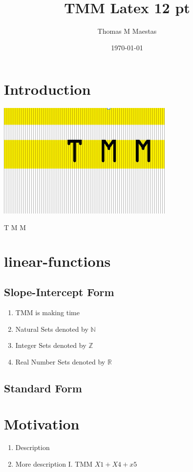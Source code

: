 \documentclass[12pt,letterpaper]{article}
\begin{document}
\date{\today}
\title{TMM Latex 12 pt}
\author{Thomas M Maestas}
\maketitle
\section{Introduction} 
\begin{center}
\includegraphics[scale=0.5]{../assets/TMM.jpg}
\end{center}
\begin{huge}T M M 
\end{huge}
\section{linear-functions}
\subsection{Slope-Intercept Form}
\begin{enumerate}
\item TMM is making time
\item Natural Sets denoted by $\mathbb{N}$
\item Integer Sets denoted by $\mathbb{Z}$
\item Real Number Sets denoted by $\mathbb{R}$
\end{enumerate}
\subsection{Standard Form}
\section{Motivation}
\begin{enumerate}
\item Description
\item More description
I. TMM $X1 + X4 +x5$
\end{enumerate}
\end{document}
